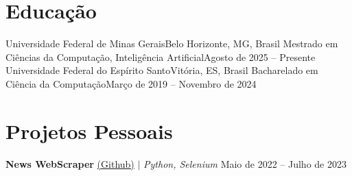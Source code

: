   
  
\resumeSubHeadingListEnd

\section{Educação}
  \resumeSubHeadingListStart
    \resumeSubheading
      {Universidade Federal de Minas Gerais}{Belo Horizonte, MG, Brasil}
      {Mestrado em Ciências da Computação, Inteligência Artificial}{Agosto de 2025 -- Presente}
      \resumeItemListStart
      \resumeItemListEnd
    \resumeSubheading
      {Universidade Federal do Espírito Santo}{Vitória, ES, Brasil}
      {Bacharelado em Ciência da Computação}{Março de 2019 -- Novembro de 2024}
  \resumeSubHeadingListEnd


\section{Projetos Pessoais}
\resumeSubHeadingListStart
\resumeProjectHeading
    {\textbf{News WebScraper} \href{https://github.com/ivarejao/veja-news-scraper}{(Github)} $|$ \emph{Python, Selenium} }{Maio de 2022 -- Julho de 2023}
    \resumeItemListStart
    \resumeItemListEnd
\resumeSubHeadingListEnd




